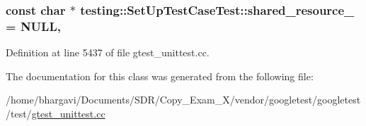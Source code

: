 \subsubsection[{\texorpdfstring{shared\+\_\+resource\+\_\+}{shared_resource_}}]{\setlength{\rightskip}{0pt plus 5cm}const char $\ast$ testing\+::\+Set\+Up\+Test\+Case\+Test\+::shared\+\_\+resource\+\_\+ = N\+U\+LL\hspace{0.3cm}{\ttfamily [static]}, {\ttfamily [protected]}}\hypertarget{classtesting_1_1_set_up_test_case_test_a904e77fd9a628b6a9aca0280665fd040}{}\label{classtesting_1_1_set_up_test_case_test_a904e77fd9a628b6a9aca0280665fd040}


Definition at line 5437 of file gtest\+\_\+unittest.\+cc.



The documentation for this class was generated from the following file\+:\begin{DoxyCompactItemize}
\item 
/home/bhargavi/\+Documents/\+S\+D\+R/\+Copy\+\_\+\+Exam\+\_\+X/vendor/googletest/googletest/test/\hyperlink{gtest__unittest_8cc}{gtest\+\_\+unittest.\+cc}\end{DoxyCompactItemize}
